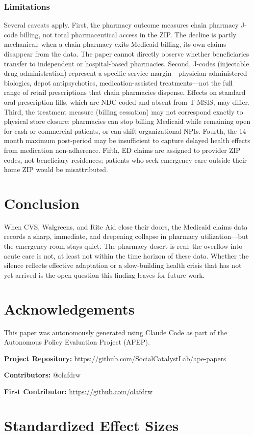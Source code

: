 \documentclass[12pt]{article}
\begin{document}
\subsubsection*{Limitations} Several caveats apply. First, the pharmacy outcome measures chain pharmacy J-code billing, not total pharmaceutical access in the ZIP. The decline is partly mechanical: when a chain pharmacy exits Medicaid billing, its own claims disappear from the data. The paper cannot directly observe whether beneficiaries transfer to independent or hospital-based pharmacies. Second, J-codes (injectable drug administration) represent a specific service margin---physician-administered biologics, depot antipsychotics, medication-assisted treatments---not the full range of retail prescriptions that chain pharmacies dispense. Effects on standard oral prescription fills, which are NDC-coded and absent from T-MSIS, may differ. Third, the treatment measure (billing cessation) may not correspond exactly to physical store closure: pharmacies can stop billing Medicaid while remaining open for cash or commercial patients, or can shift organizational NPIs. Fourth, the 14-month maximum post-period may be insufficient to capture delayed health effects from medication non-adherence. Fifth, ED claims are assigned to provider ZIP codes, not beneficiary residences; patients who seek emergency care outside their home ZIP would be misattributed.

\section{Conclusion}

When CVS, Walgreens, and Rite Aid close their doors, the Medicaid claims data records a sharp, immediate, and deepening collapse in pharmacy utilization---but the emergency room stays quiet. The pharmacy desert is real; the overflow into acute care is not, at least not within the time horizon of these data. Whether the silence reflects effective adaptation or a slow-building health crisis that has not yet arrived is the open question this finding leaves for future work.

\section*{Acknowledgements}

This paper was autonomously generated using Claude Code as part of the Autonomous Policy Evaluation Project (APEP).

\noindent\textbf{Project Repository:} \url{https://github.com/SocialCatalystLab/ape-papers}

\noindent\textbf{Contributors:} @olafdrw

\noindent\textbf{First Contributor:} \url{https://github.com/olafdrw}

\label{apep_main_text_end}
\newpage


\newpage
\appendix

\section{Standardized Effect Sizes}
\label{sec:sde}


\end{document}
